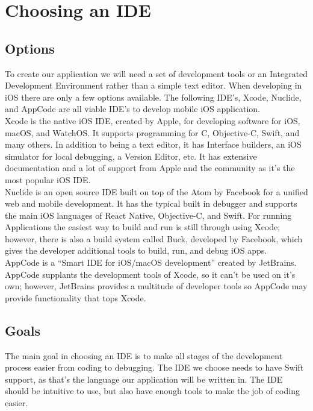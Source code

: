 \documentclass[letterpaper,10pt,titlepage]{article}
\begin{document}
\section{Choosing an IDE}
\subsection{Options}
To create our application we will need a set of development tools or an Integrated Development Environment rather than a simple text editor. When developing in iOS there are only a few options available. The following IDE's, Xcode, Nuclide, and AppCode are all viable IDE's to develop mobile iOS application.\\

Xcode is the native iOS IDE, created by Apple, for developing software for iOS, macOS, and WatchOS. It supports programming for C, Objective-C, Swift, and many others. In addition to being a text editor, it has Interface builders, an iOS simulator for local debugging, a Version Editor, etc. It has extensive documentation and a lot of support from Apple and the community as it's the most popular iOS IDE.\cite{idepara3}\\

Nuclide is an open source IDE built on top of the Atom by Facebook for a unified web and mobile development. It has the typical built in debugger and supports the main iOS languages of React Native, Objective-C, and Swift. For running Applications the easiest way to build and run is still through using Xcode; however, there is also a build system called Buck, developed by Facebook, which gives the developer additional tools to build, run, and debug iOS apps.\cite{idepara1}\\

AppCode is a “Smart IDE for iOS/macOS development” created by JetBrains. AppCode supplants the development tools of Xcode, so it can't be used on it's own; however, JetBrains provides a multitude of developer tools so AppCode may provide functionality that tops Xcode.\cite{idepara2}\\

\subsection{Goals}

The main goal in choosing an IDE is to make all stages of the development process easier from coding to debugging. The IDE we choose needs to have Swift support, as that's the language our application will be written in. The IDE should be intuitive to use, but also have enough tools to make the job of coding easier.\\
\end{document}

